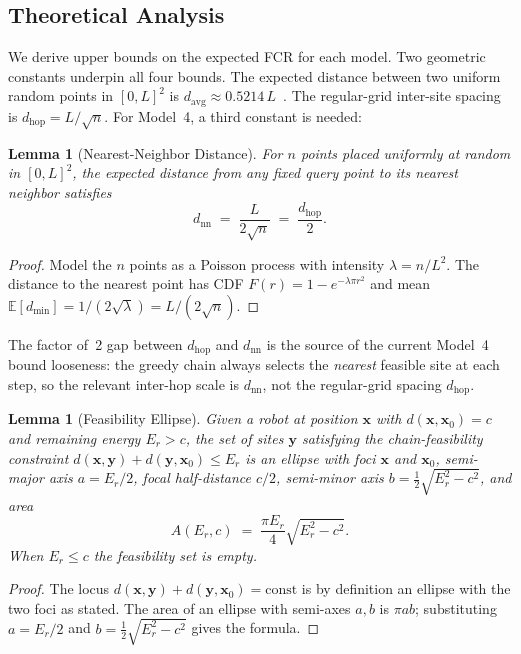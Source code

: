 \documentclass[conference]{IEEEtran}
\newtheorem{lemma}[theorem]{Lemma}
\begin{document}
\subsection{Theoretical Analysis}\label{sec:analysis}

We derive upper bounds on the expected FCR for each model.
Two geometric constants underpin all four bounds.
The expected distance between two uniform random points in $[0,L]^2$ is
$d_{\mathrm{avg}} \approx 0.5214\,L$~\cite{Robbins1978}.
The regular-grid inter-site spacing is $d_{\mathrm{hop}} = L/\sqrt{n}$.
For Model~4, a third constant is needed:

\begin{lemma}[Nearest-Neighbor Distance]\label{lem:nn}
For $n$ points placed uniformly at random in $[0,L]^2$, the expected
distance from any fixed query point to its nearest neighbor satisfies
\[
  d_{\mathrm{nn}} \;=\; \frac{L}{2\sqrt{n}} \;=\; \frac{d_{\mathrm{hop}}}{2}.
\]
\end{lemma}
\begin{proof}
Model the $n$ points as a Poisson process with intensity $\lambda = n/L^2$.
The distance to the nearest point has CDF
$F(r) = 1 - e^{-\lambda\pi r^2}$ and mean
$\mathbb{E}[d_{\min}] = 1/(2\sqrt{\lambda}) = L/(2\sqrt{n})$.
\end{proof}

\noindent
The factor of~2 gap between $d_{\mathrm{hop}}$ and $d_{\mathrm{nn}}$ is the
source of the current Model~4 bound looseness: the greedy chain always
selects the \emph{nearest} feasible site at each step, so the relevant
inter-hop scale is $d_{\mathrm{nn}}$, not the regular-grid spacing $d_{\mathrm{hop}}$.

\begin{lemma}[Feasibility Ellipse]\label{lem:ellipse}
Given a robot at position $\mathbf{x}$ with $d(\mathbf{x}, \mathbf{x}_0) = c$
and remaining energy $E_r > c$, the set of sites $\mathbf{y}$ satisfying
the chain-feasibility constraint
$d(\mathbf{x}, \mathbf{y}) + d(\mathbf{y}, \mathbf{x}_0) \leq E_r$
is an ellipse with foci $\mathbf{x}$ and $\mathbf{x}_0$, semi-major axis
$a = E_r/2$, focal half-distance $c/2$, semi-minor axis
$b = \tfrac{1}{2}\sqrt{E_r^2 - c^2}$, and area
\[
  A(E_r, c) \;=\; \frac{\pi E_r}{4}\sqrt{E_r^2 - c^2}.
\]
When $E_r \leq c$ the feasibility set is empty.
\end{lemma}
\begin{proof}
The locus $d(\mathbf{x},\mathbf{y}) + d(\mathbf{y},\mathbf{x}_0) = \text{const}$
is by definition an ellipse with the two foci as stated.
The area of an ellipse with semi-axes $a, b$ is $\pi ab$; substituting
$a = E_r/2$ and $b = \tfrac{1}{2}\sqrt{E_r^2-c^2}$ gives the formula.
\end{proof}
\end{document}
